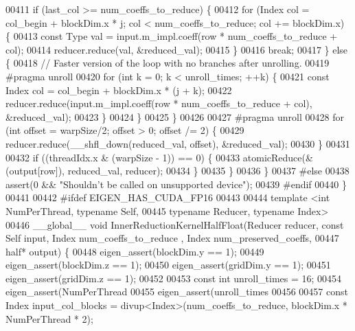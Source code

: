 \begin{DoxyCode}
00411         \textcolor{keywordflow}{if} (last\_col >= num\_coeffs\_to\_reduce) \{
00412           \textcolor{keywordflow}{for} (Index col = col\_begin + blockDim.x * j; col < num\_coeffs\_to\_reduce; col += blockDim.x) \{
00413             \textcolor{keyword}{const} Type val = input.m\_impl.coeff(row * num\_coeffs\_to\_reduce + col);
00414             reducer.reduce(val, &reduced\_val);
00415           \}
00416           \textcolor{keywordflow}{break};
00417         \} \textcolor{keywordflow}{else} \{
00418           \textcolor{comment}{// Faster version of the loop with no branches after unrolling.}
00419 \textcolor{preprocessor}{#pragma unroll}
00420           \textcolor{keywordflow}{for} (\textcolor{keywordtype}{int} k = 0; k < unroll\_times; ++k) \{
00421             \textcolor{keyword}{const} Index col = col\_begin + blockDim.x * (j + k);
00422             reducer.reduce(input.m\_impl.coeff(row * num\_coeffs\_to\_reduce + col), &reduced\_val);
00423           \}
00424         \}
00425       \}
00426 
00427 \textcolor{preprocessor}{#pragma unroll}
00428       \textcolor{keywordflow}{for} (\textcolor{keywordtype}{int} offset = warpSize/2; offset > 0; offset /= 2) \{
00429         reducer.reduce(\_\_shfl\_down(reduced\_val, offset), &reduced\_val);
00430       \}
00431 
00432       \textcolor{keywordflow}{if} ((threadIdx.x & (warpSize - 1)) == 0) \{
00433         atomicReduce(&(output[row]), reduced\_val, reducer);
00434       \}
00435     \}
00436   \}
00437 \textcolor{preprocessor}{#else}
00438   assert(0 && \textcolor{stringliteral}{"Shouldn't be called on unsupported device"});
00439 \textcolor{preprocessor}{#endif}
00440 \}
00441 
00442 \textcolor{preprocessor}{#ifdef EIGEN\_HAS\_CUDA\_FP16}
00443 
00444 \textcolor{keyword}{template} <\textcolor{keywordtype}{int} NumPerThread, \textcolor{keyword}{typename} Self,
00445           \textcolor{keyword}{typename} Reducer, \textcolor{keyword}{typename} Index>
00446 \_\_global\_\_ \textcolor{keywordtype}{void} InnerReductionKernelHalfFloat(Reducer reducer, \textcolor{keyword}{const} Self input, Index num\_coeffs\_to\_reduce
      , Index num\_preserved\_coeffs,
00447                                               half* output) \{
00448   eigen\_assert(blockDim.y == 1);
00449   eigen\_assert(blockDim.z == 1);
00450   eigen\_assert(gridDim.y == 1);
00451   eigen\_assert(gridDim.z == 1);
00452 
00453   \textcolor{keyword}{const} \textcolor{keywordtype}{int} unroll\_times = 16;
00454   eigen\_assert(NumPerThread %
00455   eigen\_assert(unroll\_times %
00456 
00457   \textcolor{keyword}{const} Index input\_col\_blocks = divup<Index>(num\_coeffs\_to\_reduce, blockDim.x * NumPerThread * 2);

\end{DoxyCode}
